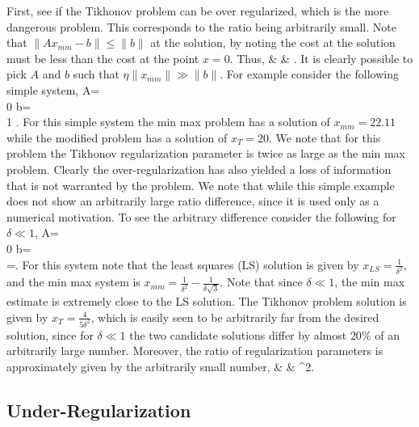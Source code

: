 First, see if the Tikhonov problem can be over regularized, which is the more dangerous problem.  This corresponds to the ratio being arbitrarily small.  Note that $\| Ax_{mm}-b\|\leq\| b\|$ at the solution, by noting the cost at the solution must be less than the cost at the point $x=0$.  Thus,
\beq
{} & \leq &
     .
\eeq
It is clearly possible to pick $A$ and $b$ such that $\eta\| x_{mm}\| \gg \| b\|$.  For example consider the following simple system,
\beq
A= \\
                0 \emat \qquad
b= \\
                1 \emat \qquad
{}.
\eeq
For this simple system the min max problem has a solution of $x_{mm}=22.11$ while the modified problem has a solution of $x_{T}=20$.  We note that for this problem the Tikhonov regularization parameter is twice as large as the min max problem.  Clearly the over-regularization has also yielded a loss of information that is not warranted by the problem.  We note that while this simple example does not show an arbitrarily large ratio difference, since it is used only as a numerical motivation.  To see the arbitrary difference consider the following for $\delta \ll 1$,
\beq
A=\bmat \delta \\
                0 \emat \qquad
b=\bmat {} \\
                \delta \emat \qquad
\eta =.
\eeq
For this system note that the least squares (LS) solution is given by $x_{LS}=\frac{1}{\delta^{2}}$, and the min max system is $x_{mm}=\frac{1}{\delta^{2}}-\frac{1}{\delta\sqrt{3}}$.  Note that since $\delta \ll 1$, the min max estimate is extremely close to the LS solution.  The Tikhonov problem solution is given by $x_{T}=\frac{4}{5\delta^{2}}$, which is easily seen to be arbitrarily far from the desired solution, since for $\delta \ll 1$ the two candidate solutions differ by almost $20\%$ of an arbitrarily large number.  Moreover, the ratio of regularization parameters is approximately given by the arbitrarily small number,
\beq
{} & \approx & \delta^{2}.
\eeq

\subsection{Under-Regularization}

